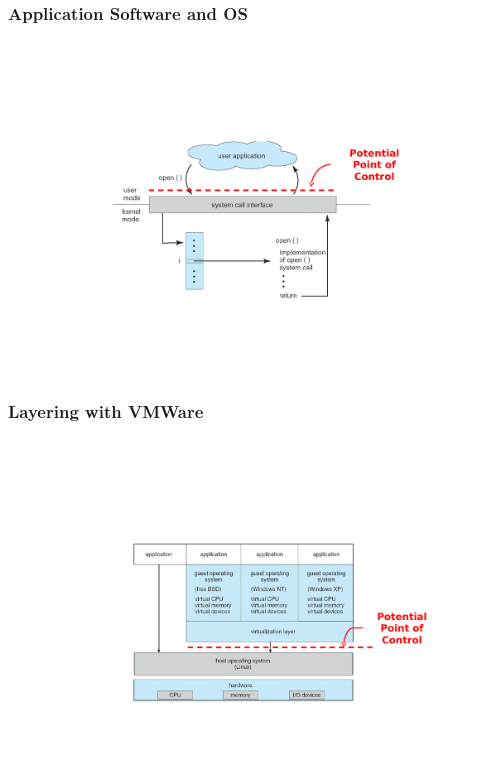 \documentclass[t,handout]{beamer}
\begin{document}
\begin{frame}
\frametitle{Application Software and OS}
\begin{figure}[!t]
\centering
\includegraphics[width=\textwidth]{9}
\end{figure}
\end{frame}

\begin{frame}
\frametitle{Layering with VMWare}
\begin{figure}[!t]
\centering
\includegraphics[width=\textwidth]{10}
\end{figure}
\end{frame}
\end{document}
